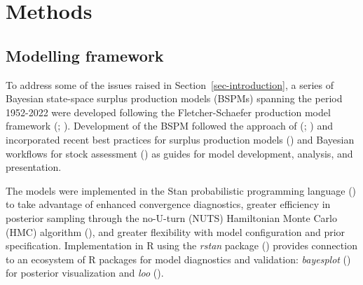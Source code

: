\documentclass[
  11pt,
]{SCreport}
\begin{document}
\section{Methods}\label{sec-methods}

\subsection{Modelling framework}\label{sec-model-framework}

To address some of the issues raised in Section~\ref{sec-introduction},
a series of Bayesian state-space surplus production models (BSPMs)
spanning the period 1952-2022 were developed following the
Fletcher-Schaefer production model framework
(;
). Development
of the BSPM followed the approach of (; )
and incorporated recent best practices for surplus production models
() and Bayesian
workflows for stock assessment
() as guides for
model development, analysis, and presentation.

The models were implemented in the Stan probabilistic programming
language ()
to take advantage of enhanced convergence diagnostics, greater
efficiency in posterior sampling through the no-U-turn (NUTS)
Hamiltonian Monte Carlo (HMC) algorithm
(), and greater flexibility with model configuration and prior
specification. Implementation in R using the \emph{rstan} package
() provides
connection to an ecosystem of R packages for model diagnostics and
validation: \emph{bayesplot} () for posterior visualization and \emph{loo}
().
\end{document}
